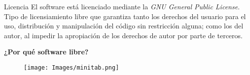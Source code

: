 \begin{frame}[t]{Licencia}\vspace{10pt}
El software está licenciado mediante la \textit{GNU General Public License}. Tipo de licensiamiento libre que garantiza tanto los derechos del usuario para el uso, distribución y manipulación del código sin restricción alguna; como los del autor, al impedir la apropiación de los derechos de autor por parte de terceros.

\textbf{¿Por qué software libre?}

\begin{figure}
	\texttt{[image: Images/minitab.png]}
\end{figure}

\end{frame}